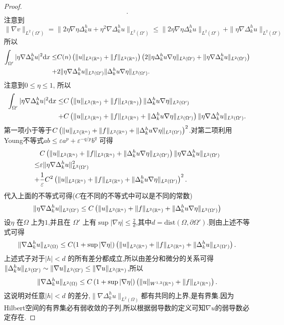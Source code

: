 \begin{proof}
\begin{align*}
  .\end{align*}
  注意到
  \[
    \|\nabla v\|_{L^2(\Omega')}= \|2\eta\nabla\eta \Delta^{h}_ku +\eta^2\nabla \Delta^{h}_ku \|_{L^2(\Omega')}\le \|2\eta \nabla \eta \Delta^{h}_k u\|_{L^2(\Omega')}+\|\eta \nabla \Delta^{h}_ku\|_{L^2(\Omega')}
  \]
  所以
  \begin{align*}
    \int_{\Omega'}|\eta \nabla  \Delta^{h}_k u|^2\mathrm{d}x\le & C(n)\left( \|u\|_{L^2(\mathbb{R}^{n})}+\|f\|_{L^2(\mathbb{R}^{n})} \right) \left( 2\|\eta  \Delta^{h}_ku \nabla \eta\|_{L^2(\Omega')}+\|\eta \nabla  \Delta^{h}_k u\|_{L^2(\Omega')} \right) \\
    + & 2 \|\eta \nabla \Delta^{h}_ku\|_{L^2(\Omega')}\|\Delta^{h}_ku \nabla \eta\|_{L^2(\Omega')}
  .\end{align*}
注意到$0\le \eta\le 1$,
  所以
  \begin{align*}
    \int_{\Omega'}|\eta\nabla \Delta^{h}_ku|^2\mathrm{d}x\le & C \left( \|u\|_{L^2(\mathbb{R}^{n})}+\|f\|_{L^2(\mathbb{R}^{n})} \right)\|\Delta_k^{h}u\nabla \eta\|_{L^2(\Omega')} \\
    + & C\left( \|u\|_{L^2(\mathbb{R}^{n})}+\|f\|_{L^2(\mathbb{R}^{n})} +\|\Delta_k^{h}u \nabla \eta\|_{L^2(\Omega')}\right) \|\eta \nabla \Delta^{h}_ku\|_{L^2(\Omega')}.
  \end{align*}
  第一项小于等于$C\left( \|u\|_{L^2(\mathbb{R}^{n})}+\|f\|_{L^2(\mathbb{R}^{n})} +\|\Delta^{h}_ku \nabla \eta\|_{L^2(\Omega')}\right)^2 $.对第二项利用Young不等式$ab\le\varepsilon a^{p}+\varepsilon ^{-q /p}b^{q}$ 可得
  \begin{align*}
    &C\left( \|u\|_{L^2(\mathbb{R}^{n})}+\|f\|_{L^2(\mathbb{R}^{n})}+\|\Delta^{h}_k u\nabla \eta\|_{L^2(\Omega')} \right) \|\eta \nabla  \Delta^{h}_k u\|_{L^2(\Omega')}\\
    \le & \varepsilon  \|\eta \nabla \Delta^{h}_k u \|_{L^2(\Omega')}^2\\
    + & \frac{1}{\varepsilon } C^2 \left( \|u\|_{L^2(\mathbb{R}^{n})}+\|f\|_{L^2(\mathbb{R}^{n})}+\|\Delta^{h}_k u\nabla \eta\|_{L^2(\Omega')} \right)^2 
  .\end{align*}
  代入上面的不等式可得($C$在不同的不等式中可以是不同的常数)
  \[
    \|\eta\nabla \Delta^{h}_k u\|_{L^2(\Omega')}\le C \left( \|u\|_{L^2(\mathbb{R}^{n})}+\|f\|_{L^2(\mathbb{R}^{n})}+\|\Delta^{h}_ku\nabla \eta\|_{L^2(\Omega')} \right) 
  \]
设$\eta$ 在$\Omega$ 上为$1$,并且在 $\Omega'$ 上有$\sup|\nabla \eta|\le \frac{2}{d}$,其中$d= \mathrm{dist}\left( \Omega,\partial \Omega' \right) $.则由上述不等式可得
\[
  \|\nabla  \Delta^{h}_k u\|_{L^2(\Omega)}\le C(1+\sup|\nabla \eta|)\left(\|u\|_{L^2(\mathbb{R}^{n})}+\|f\|_{L^2(\mathbb{R}^{n})}+\|\Delta^{h}_ku\|_{L^2(\Omega')}  \right) .
\] 
上述式子对于$|h|<d$ 的所有差分都成立,所以由差分和微分的关系可得$\|\Delta^{h}_k u\|_{L^2(\Omega')}\sim \|\nabla u\|_{L^2(\Omega')}\le \|\nabla u\|_{L^2(\mathbb{R}^{n})}$,所以
\[
  \|\nabla \Delta^{h}_ku\|_{L^2(\Omega)}\le C\left( 1+\sup|\nabla \eta| \right) \left( \|u\|_{W^{1,2}(\mathbb{R}^{n})}+\|f\|_{L^2(\mathbb{R}^{n})}\right). 
\] 
这说明对任意$|h|<d$ 的差分,$\|\nabla \Delta^{h}_ku\|_{L^2(\Omega)}$都有共同的上界,是有界集.因为Hilbert空间的有界集必有弱收敛的子列,所以根据弱导数的定义可知$\nabla u$的弱导数必定存在.
\end{proof}

